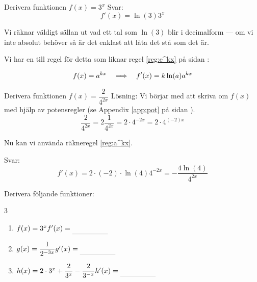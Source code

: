 \documentclass[a4paper, 12pt]{article}
\begin{document}
\begin{exempel}
    \label{ex:a^x}
    Derivera funktionen $f(x) = 3^x$
    \dinkus
    Svar: \[f'(x) = \ln (3) 3^x\]
\end{exempel}

Vi räknar väldigt sällan ut vad ett tal som $\ln(3)$ blir i decimalform --- om vi inte absolut behöver så är det enklast att låta det stå som det är.

Vi har en till regel för detta som liknar regel \ref*{reg:e^kx} på sidan \pageref*{reg:e^kx}:

\begin{regel}
    \label{reg:a^kx}
    \[f(x) = a^{kx} \hspace{1em} \Longrightarrow \hspace{1em} f'(x) = k\ln(a)a^{kx}\]
\end{regel}


\begin{exempel}
    Derivera funktionen $f(x) = \dfrac 2{4^{2x}}$
    \dinkus
    Lösning: Vi börjar med att skriva om $f(x)$ med hjälp av potensregler (se Appendix \ref*{app:pot} på sidan \pageref*{app:pot}).
    \[\dfrac{2}{4^{2x}} = 2\dfrac{1}{4^{2x}} = 2\cdot 4^{-2x} = 2\cdot 4^{(-2)x}\]

    Nu kan vi använda räkneregel \ref*{reg:a^kx}.

    Svar: \[f'(x) = 2\cdot (-2) \cdot \ln(4) 4^{-2x} = - \dfrac {4\ln(4)} {4^{2x}}\]
\end{exempel}

\begin{uppgifter}
    \label{upp:a^kx}
    Derivera följande funktioner:
    \begin{multicols}{3}
        \begin{enumerate}
            \item $f(x) = 3^x \\ f'(x) \ans$
            \item $g(x) = \dfrac{1}{2^{-3x}} \\ g'(x) \ans$
            \item $h(x) = 2\cdot 3^x + \dfrac 2{3^x} - \dfrac 2{3^{-x}} \\ h'(x) \ans$
        \end{enumerate}
    \end{multicols}
\end{uppgifter}

\newpage
\end{document}
